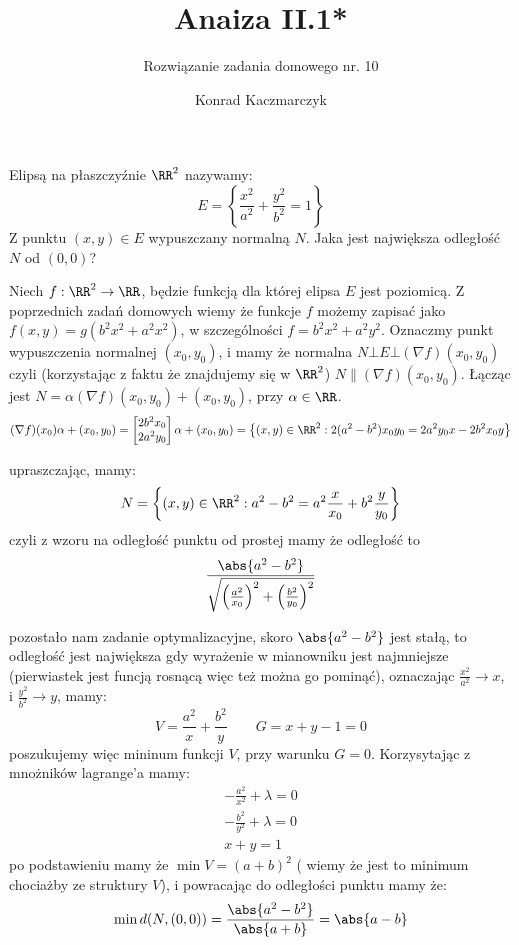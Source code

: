 \documentclass[11pt]{scrartcl}
\author{Konrad Kaczmarczyk}
\begin{document}
  \title{Anaiza II.1*}
  \subtitle{Rozwiązanie zadania domowego nr. 10}
  \maketitle
    \begin{zadanie*}
        Elipsą na płaszczyźnie $\RR^2$ nazywamy:
        \[
            E = \left \{ \frac{x^2}{a^2} + \frac{y^2}{b^2} = 1 \right \}
        \]
        Z punktu $(x,y) \in E$ wypuszczany normalną $N$. Jaka jest największa odległość $N$ od $(0, 0)$?
    \end{zadanie*}
    
    Niech $f : \RR^2 \to \RR$, będzie funkcją dla której elipsa $E$ jest poziomicą. Z poprzednich zadań domowych wiemy że funkcje $f$ możemy zapisać jako $f(x, y) = g(b^2 x^2 + a^2 x^2)$, w szczególności $f = b^2 x^2 + a^2 y^2$. Oznaczmy punkt wypuszczenia normalnej $(x_0, y_0)$, i mamy że normalna $N \bot E \bot (\nabla f)(x_0, y_0)$ czyli (korzystając z faktu że znajdujemy się w $\RR^2$) $N \parallel (\nabla f)(x_0, y_0)$. Łącząc jest $N = \alpha \left ( \nabla f \right )(x_0, y_0) + (x_0, y_0)$, przy $\alpha \in \RR$.
    \begin{gather*}
      (\nabla f)(x_0) \alpha + (x_0, y_0)  = 
      \begin{bmatrix}
          2 b^2 x_0 \\ 2 a^2 y_0
      \end{bmatrix} \alpha + (x_0, y_0)
      = \left \{(x,y) \in \RR^2 : 2 (a^2 - b^2) x_0 y_0 = 2 a^2 y_0 x - 2 b^2 x_0 y \right \}
    \end{gather*}
    
    upraszczając, mamy:
    \[
      N = \left \{ (x,y) \in \RR^2 : a^2 - b^2 = a^2 \frac{x}{x_0} + b^2 \frac{y}{y_0}   \right \}
    \]
    czyli z wzoru na odległość punktu od prostej mamy że odległość to
    \[
        \frac{\abs{a^2 - b^2} }{\sqrt{\left ( \frac{a^2}{x_0} \right )^2 + \left ( \frac{b^2}{y_0} \right )^2 }  }
    \]

    pozostało nam zadanie optymalizacyjne, skoro $\abs{a^2 - b^2} $ jest stałą, to odległość jest największa gdy wyrażenie w mianowniku jest najmniejsze (pierwiastek jest funcją rosnącą więc też można go pominąć), oznaczając $\frac{x^2}{a^2} \to x$, i $\frac{y^2}{b^2} \to y$, mamy:
    \[
        V = \frac{a^2}{x} + \frac{b^2}{y} \qquad G = x + y - 1 = 0
    \]
    poszukujemy więc mininum funkcji $V$, przy warunku $G = 0$. Korzysytając z mnożników lagrange'a mamy:
    \begin{gather*}
        - \frac{a^2}{x^2} + \lambda = 0 \\
        - \frac{b^2}{y^2} + \lambda = 0 \\
        x + y = 1
    \end{gather*}
    po podstawieniu mamy że $\min V = (a+b)^2$ ( wiemy że jest to minimum chociażby ze struktury $V$), i powracając do odległości punktu mamy że:
    \[
        \min d(N, (0, 0)) = \frac{\abs{a^2 - b^2}  }{\abs{a + b} } = \abs{a - b} 
    \]
    
\end{document}
